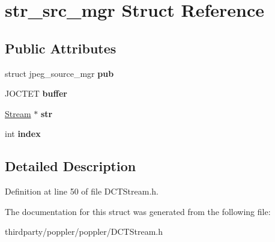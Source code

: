 \hypertarget{structstr__src__mgr}{}\section{str\+\_\+src\+\_\+mgr Struct Reference}
\label{structstr__src__mgr}
\subsection*{Public Attributes}
\begin{DoxyCompactItemize}
\item 
\mbox{\label{structstr__src__mgr_a4a82bf6b282108cc901b26e8de5d107d}} 
struct jpeg\+\_\+source\+\_\+mgr {\bfseries pub}
\item 
\mbox{\label{structstr__src__mgr_a53c7899edeaea620b0e8d9f1f49067a3}} 
J\+O\+C\+T\+ET {\bfseries buffer}
\item 
\mbox{\label{structstr__src__mgr_a1c3f062b95171ac946d95b552e2638cb}} 
\hyperlink{class_stream}{Stream} $\ast$ {\bfseries str}
\item 
\mbox{\label{structstr__src__mgr_a05d05541b19e7dd6c46573a0a074c647}} 
int {\bfseries index}
\end{DoxyCompactItemize}


\subsection{Detailed Description}


Definition at line 50 of file D\+C\+T\+Stream.\+h.



The documentation for this struct was generated from the following file\+:\begin{DoxyCompactItemize}
\item 
thirdparty/poppler/poppler/D\+C\+T\+Stream.\+h\end{DoxyCompactItemize}
